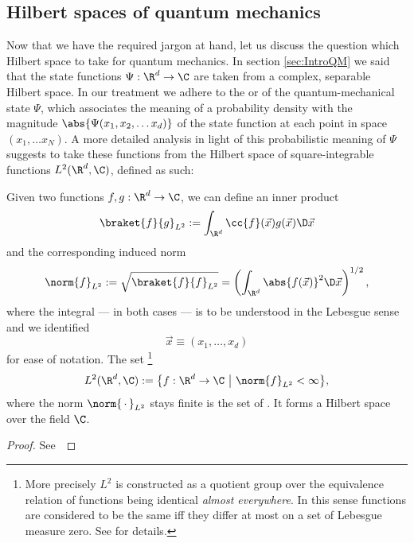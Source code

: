 \subsection{Hilbert spaces of quantum mechanics}

Now that we have the required jargon at hand,
let us discuss the question which Hilbert space to take for quantum mechanics.
In section \ref{sec:IntroQM} we said that the state functions
$\Psi : \R^d \to \C$ are taken from a complex, separable Hilbert space.
In our treatment we adhere to the
 or 
of the quantum-mechanical state $\Psi$,
which associates the meaning of a probability density
with the magnitude $\abs{\Psi(x_1, x_2, \ldots x_d)}$
of the state function at each point in space $(x_1, \ldots x_N)$.
A more detailed analysis in light of this probabilistic meaning of $\Psi$
suggests to take these functions from the Hilbert space of square-integrable functions
$L^2(\R^d, \C)$, defined as such:

\begin{prop}
	\label{prop:L2HilbertSpace}
	Given two functions $f, g : \R^d \to \C$,
	we can define an inner product
	\begin{equation}
		\braket{f}{g}_{L^2} := \int_{\R^d} \cc{f}(\vec{x}) g(\vec{x}) \D \vec{x}
		\label{eqn:defL2InnProd}
	\end{equation}
	and the corresponding induced norm
	\begin{equation}
		\norm{f}_{L^2} := \sqrt{\braket{f}{f}_{L^2}} = \left( \int_{\R^d} \abs{f(\vec{x})}^2 \D \vec{x} \right)^{1/2},
		\label{eqn:defL2Norm}
	\end{equation}
	where the integral --- in both cases --- is to be understood in the Lebesgue sense
	and we identified
	\[ \vec{x} \equiv (x_1, \ldots, x_d) \]
	for ease of notation. The set%
	\footnote{More precisely $L^2$ is constructed as a quotient group
		over the equivalence relation of functions being identical
		\textit{almost everywhere}. In this sense functions are considered
		to be the same iff they differ at most on a set of Lebesgue measure zero.
		See \cite{DiracNotation} for details.}
	\[ L^2(\R^d, \C) := \big\{ f : \R^d \to \C ~\big|~ \norm{f}_{L^2} < \infty \big\}, \]
	where the norm $\norm{\slot}_{L^2}$ stays finite
	is the set of .
	It forms a Hilbert space over the field $\C$.
	\begin{proof}
		See~\cite{Adams2003}
	\end{proof}
\end{prop}

